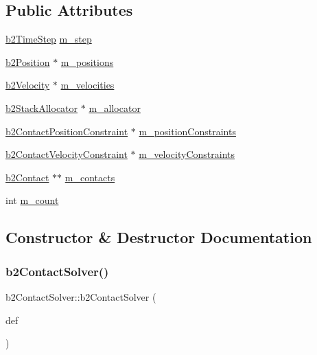 \subsection*{Public Attributes}
\begin{DoxyCompactItemize}
\item 
\mbox{\hyperlink{structb2_time_step}{b2\+Time\+Step}} \mbox{\hyperlink{classb2_contact_solver_aac78600ba5fd3249bac20678cbc9f101}{m\+\_\+step}}
\item 
\mbox{\hyperlink{structb2_position}{b2\+Position}} $\ast$ \mbox{\hyperlink{classb2_contact_solver_a39b973c8311e522f44cda9053dcea5a8}{m\+\_\+positions}}
\item 
\mbox{\hyperlink{structb2_velocity}{b2\+Velocity}} $\ast$ \mbox{\hyperlink{classb2_contact_solver_aae6dae9341dbbd780e7b3ec6b1b332f9}{m\+\_\+velocities}}
\item 
\mbox{\hyperlink{classb2_stack_allocator}{b2\+Stack\+Allocator}} $\ast$ \mbox{\hyperlink{classb2_contact_solver_a6a2c9f5470a469e50d7f33f8d9095abe}{m\+\_\+allocator}}
\item 
\mbox{\hyperlink{structb2_contact_position_constraint}{b2\+Contact\+Position\+Constraint}} $\ast$ \mbox{\hyperlink{classb2_contact_solver_ac0f4106f7cf67d185a7a4f3fd5a4e4ce}{m\+\_\+position\+Constraints}}
\item 
\mbox{\hyperlink{structb2_contact_velocity_constraint}{b2\+Contact\+Velocity\+Constraint}} $\ast$ \mbox{\hyperlink{classb2_contact_solver_a616319ffa7ceb509b8189f07a070f7c7}{m\+\_\+velocity\+Constraints}}
\item 
\mbox{\hyperlink{classb2_contact}{b2\+Contact}} $\ast$$\ast$ \mbox{\hyperlink{classb2_contact_solver_aa1c7370d1d2681f9d49a494f9b0a38c6}{m\+\_\+contacts}}
\item 
int \mbox{\hyperlink{classb2_contact_solver_ab5b74c0fadf0d5d8997700b5ff91ea91}{m\+\_\+count}}
\end{DoxyCompactItemize}


\subsection{Constructor \& Destructor Documentation}
\mbox{\label{classb2_contact_solver_ac89198165ed16eb6080d84f93229ea88}} 
\subsubsection{\texorpdfstring{b2ContactSolver()}{b2ContactSolver()}}
{\footnotesize\ttfamily b2\+Contact\+Solver\+::b2\+Contact\+Solver (\begin{DoxyParamCaption}\item[{\mbox{\hyperlink{structb2_contact_solver_def}{b2\+Contact\+Solver\+Def}} $\ast$}]{def }\end{DoxyParamCaption})}

